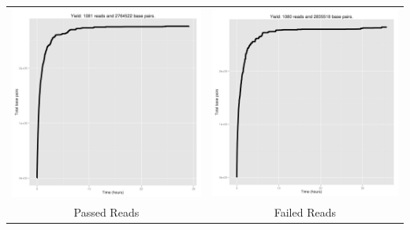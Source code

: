 \begin{tabular}{cc}
\includegraphics[width=.48\textwidth]{cumnucpass}
&
\includegraphics[width=.48\textwidth]{cumnucfail}
\\
Passed Reads
&
Failed Reads
\end{tabular}
